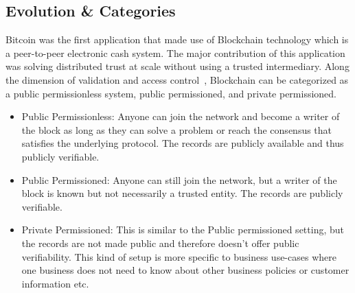 

\subsection{Evolution \& Categories}
Bitcoin was the first application that made use of Blockchain technology which
is a peer-to-peer electronic cash system. The major contribution of this
application was solving distributed trust at scale without using a trusted
intermediary. 
Along the dimension of validation and access control~\cite{voronchenko2017you},
Blockchain can be categorized as a public permissionless system, public
permissioned, and private permissioned. 
\begin{itemize}
	\item Public Permissionless: Anyone can join the network and become a writer
		of the block as long as they can solve a problem or reach the consensus
		that satisfies the underlying protocol. The records are publicly
		available and thus publicly verifiable. 
	\item Public Permissioned: Anyone can still join the network, but a writer
		of the block is known but not necessarily a trusted entity. The records
		are publicly verifiable. 
	\item Private Permissioned: This is similar to the Public permissioned
		setting, but the records are not made public and therefore doesn't
		offer public verifiability. This kind of setup is more specific to
		business use-cases where one business does not need to know about other
		business policies or customer information etc. 
\end{itemize}



